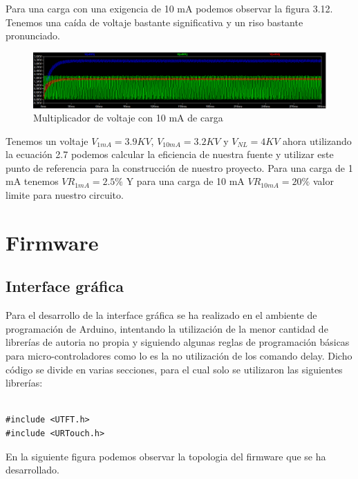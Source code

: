 Para una carga con una exigencia de 10 mA podemos observar la figura 3.12. Tenemos una caída de voltaje bastante significativa y un riso bastante pronunciado.


\begin{figure}[H]
\centering
\includegraphics[width=12cm]{Capitulo3/figs/10ma.png}
\caption{Multiplicador de voltaje con 10 mA de carga}
\end{figure}

Tenemos un voltaje $V_{1mA}=3.9KV$, $V_{10mA}=3.2KV$ y $V_{NL}=4KV$ ahora utilizando la ecuación 2.7 podemos calcular la eficiencia de nuestra fuente y utilizar este punto de referencia para la construcción de nuestro proyecto. Para una carga de 1 mA tenemos $VR_{1mA}=2.5\%$ Y para una carga de 10 mA $VR_{10mA}=20\%$ valor limite para nuestro circuito.
\newpage

\section{Firmware}
\subsection{Interface gráfica}
Para el desarrollo de la interface gráfica se ha realizado en el ambiente de programación de Arduino, intentando la utilización de la menor cantidad de librerías de autoria no propia y siguiendo algunas reglas de programación básicas para micro-controladores como lo es la no utilización de los comando delay. Dicho código se divide en varias secciones, para el cual solo se utilizaron las siguientes librerías:

\begin{verbatim}

#include <UTFT.h>
#include <URTouch.h>

\end{verbatim}

En la siguiente figura podemos observar la topologia del firmware que se ha desarrollado.\\

